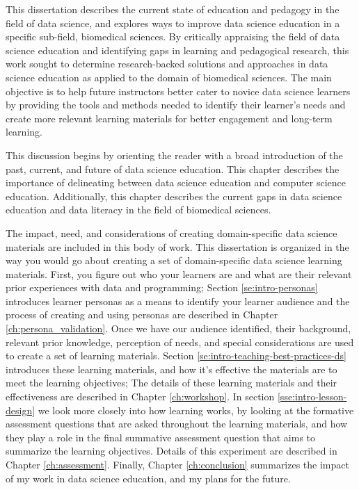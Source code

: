 \documentclass[010-intro.tex]{subfiles}
\begin{document}
This dissertation describes the current state of education and pedagogy in the field of data science,
and explores ways to improve data science education in a specific sub-field, biomedical sciences.
By critically appraising the field of data science education
and identifying gaps in learning and pedagogical research,
this work sought to determine research-backed solutions and approaches in data science education
as applied to the domain of biomedical sciences.
The main objective is to help future instructors better cater to novice data science learners
by providing the tools and methods needed to identify their learner's needs and create
more relevant learning materials for better engagement and long-term learning.

This discussion begins by orienting the reader with
a broad introduction of the past, current, and future of data science education.
This chapter describes the importance of delineating between
data science education and computer science education.
Additionally, this chapter describes the current gaps in
data science education and data literacy in the field of biomedical sciences.

The impact, need, and considerations of creating domain-specific data science materials
are included in this body of work.
This dissertation is organized in the way you would go about creating
a set of domain-specific data science learning materials.
First, you figure out who your learners are and what are their relevant prior experiences with
data and programming;
Section \ref{se:intro-personas} introduces learner personas as a means to identify your learner audience
and the process of creating and using personas are described in Chapter \ref{ch:persona_validation}.
Once we have our audience identified,
their background, relevant prior knowledge, perception of needs, and special considerations
are used to create a set of learning materials.
Section \ref{se:intro-teaching-best-practices-ds} introduces these learning materials,
and how it's effective the materials are to meet the learning objectives;
The details of these learning materials and their effectiveness are described in Chapter \ref{ch:workshop}.
In section \ref{sse:intro-lesson-design} we look more closely into how learning works,
by looking at the formative assessment questions that are asked throughout the learning materials,
and how they play a role in the final summative assessment question that aims to summarize the learning objectives.
Details of this experiment are described in Chapter \ref{ch:assessment}.
Finally, Chapter \ref{ch:conclusion} summarizes the impact of my work in data science education,
and my plans for the future.
\end{document}
